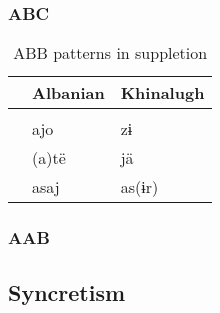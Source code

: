 \subsubsection{ABC}

\begin{table}[h]
  \center
	\caption {ABB patterns in suppletion}
	\begin{minipage}{0.4\linewidth}
		\begin{tabularx}{\textwidth}{c *{2}{Y}}
		\toprule
              & Albanian    & Khinalugh   \\
		\midrule
              &  &    \\
    \midrule
     & ajo          & zɨ         \\
     & (a)të        & jä         \\
     & asaj         & as(ɨr)     \\
    \bottomrule
		\end{tabularx}
	\end{minipage}
\end{table}



\subsubsection{AAB}


%




\subsection{Syncretism}

